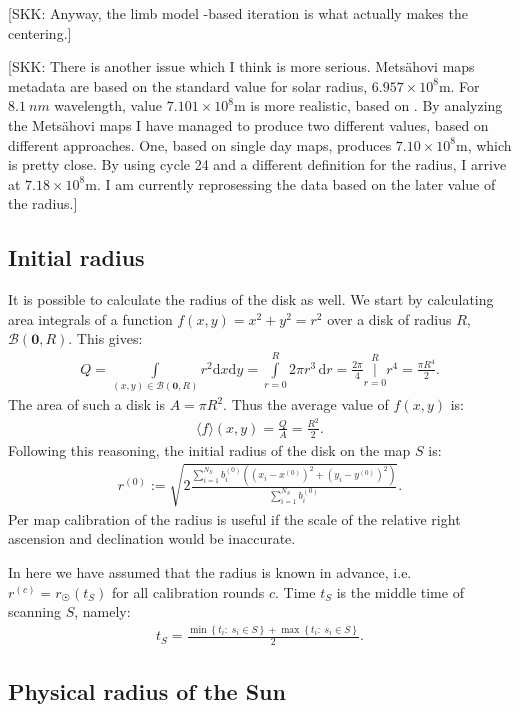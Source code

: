 \documentclass{aa}
\newcommand{\skk}[1]{\textcolor{midorange}{[SKK: #1]}} %
\newcommand{\eqnl}[2]{\begin{eqnarray}\label{#1}#2\end{eqnarray}}
\newcommand{\intef}[4]{\int \limits_{#1 = #2}^{#3} \! #4 \, \mathrm{d} #1}
\newcommand{\intes}[4]{\operatorname{\Bigg|} \limits_{#1 = #2}^{#3} \!\!\!\!\! #4}
\newcommand{\ave}[1]{\langle #1 \rangle}
\renewcommand{\min}[1]{\operatorname{min} \left\{ #1 \right\}}
\renewcommand{\max}[1]{\operatorname{max} \left\{ #1 \right\}}
\newcommand{\dd}[0]{\mathrm{d}}
\begin{document}
    \skk{Anyway, the limb model -based iteration is what actually makes the centering.}
    
    \skk{There is another issue which I think is more serious. Metsähovi maps metadata are based on the standard value 
    for solar radius, $6.957 \times 10^8 \mathrm{m}$. For $\SI{8.1}{nm}$ wavelength, value $7.101 \times 10^8 
    \mathrm{m}$ is more realistic, based on \cite{Rozelot15}. By analyzing the Metsähovi maps I have managed to produce 
    two different values, based on different approaches. One, based on single day maps, produces $7.10 \times 10^8 
    \mathrm{m}$, which is pretty close. By using cycle 24 and a different definition for the radius, I arrive at $7.18 
    \times 10^8 \mathrm{m}$. I am currently reprosessing the data based on the later value of the radius.}
    
  \subsection{Initial radius}\label{sect:initial_radius}

  It is possible to calculate the radius of the disk as well. We start by calculating area integrals of a function $f(x,y) = x^2+y^2 = r^2$ over a disk of radius $R$, $\mathcal{B}(\bm{0},R)$. This gives:
  \eqnl{initial_radius}{
  Q = \int \limits_{(x,y) \in \mathcal{B}(\bm{0},R)} \! r^2 \dd x \dd y = \intef{r}{0}{R}{2 \pi r^3} = \frac{2 \pi}{4} \intes{r}{0}{R}{r^4} = \frac{\pi R^4}{2} \text{.}
  }
  The area of such a disk is $A = \pi R^2$. Thus the average value of $f(x,y)$ is:
  \eqnl{initial_radius2}{
  \ave f(x,y) = \frac{Q}{A} = \frac{R^2}{2} \text{.}
  }
  Following this reasoning, the initial radius of the disk on the map $S$ is:
  \eqnl{initial_radius3}{
  r^{(0)} := \sqrt{2 \frac{\sum \limits_{i=1}^{N_S} b_i^{(0)} \left( \left( x_i - x^{(0)} \right)^2 + \left( y_i - y^{(0)} \right)^2 \right)}{\sum \limits_{i=1}^{N_S} b_i^{(0)}}} \text{.}
  }
  Per map calibration of the radius is useful if the scale of the relative right ascension and declination would be inaccurate.

  In here we have assumed that the radius is known in advance, i.e. $r^{(c)} = r_{\astrosun}(t_S)$ for all calibration rounds $c$. Time $t_S$ is the middle time of scanning $S$, namely:
  \eqnl{initial_radius_time}{
  t_S = \frac{\min{t_i :\; s_i \in S} + \max{ t_i :\; s_i \in S}}{2} \text{.}
  }

  \subsection{Physical radius of the Sun}\label{sect:physical_radius}
  
\end{document}
